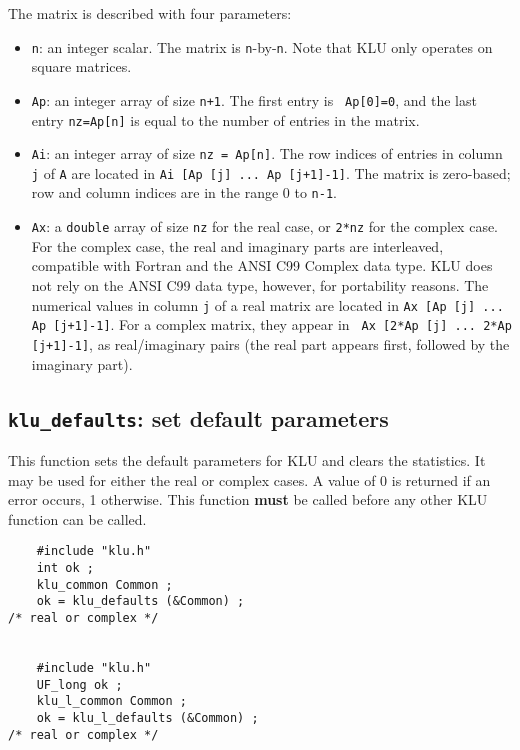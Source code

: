 \documentclass[11pt]{article}
\begin{document}
The matrix is described with four parameters:

\begin{itemize}
\item {\tt n}: an integer scalar.  The matrix is {\tt n}-by-{\tt n}.  Note that
KLU only operates on square matrices.

\item {\tt Ap}: an integer array of size {\tt n+1}.  The first entry is {\tt
Ap[0]=0}, and the last entry {\tt nz=Ap[n]} is equal to the number of entries
in the matrix.

\item {\tt Ai}: an integer array of size {\tt nz = Ap[n]}.
The row indices of entries in column {\tt j} of {\tt A} are located in
{\tt Ai [Ap [j] ... Ap [j+1]-1]}.  The matrix is zero-based; row and column
indices are in the range 0 to {\tt n-1}.

\item {\tt Ax}: a {\tt double} array of size {\tt nz} for the real case, or
{\tt 2*nz} for the complex case.  For the complex case, the real and imaginary
parts are interleaved, compatible with Fortran and the ANSI C99 Complex data
type.  KLU does not rely on the ANSI C99 data type, however, for portability
reasons.  The numerical values in column {\tt j} of a real matrix are located
in {\tt Ax [Ap [j] ... Ap [j+1]-1]}.  For a complex matrix, they appear in {\tt
Ax [2*Ap [j] ... 2*Ap [j+1]-1]}, as real/imaginary pairs (the real part appears
first, followed by the imaginary part).

\end{itemize}

\subsection{{\tt klu\_defaults}: set default parameters}

This function sets the default parameters for KLU and clears the statistics.
It may be used for either the real or complex cases.  A value of 0 is returned
if an error occurs, 1 otherwise.  This function {\bf must} be called before
any other KLU function can be called.

{\footnotesize
\begin{verbatim}
    #include "klu.h"
    int ok ;
    klu_common Common ;
    ok = klu_defaults (&Common) ;                                             /* real or complex */


    #include "klu.h"
    UF_long ok ;
    klu_l_common Common ;
    ok = klu_l_defaults (&Common) ;                                           /* real or complex */
\end{verbatim}
}
\end{document}
